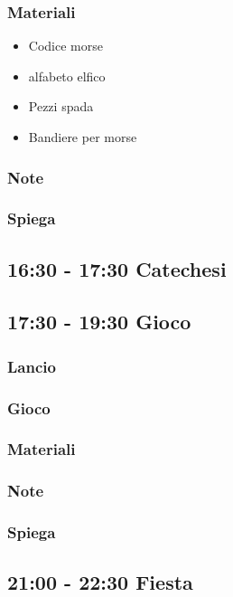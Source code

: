\documentclass[../main.tex]{subfiles}
\begin{document}
        \subsubsection{Materiali}
        \begin{itemize}
            \item Codice morse
            \item alfabeto elfico
            \item Pezzi spada
            \item Bandiere per morse
        \end{itemize}
        \subsubsection{Note}
        \subsubsection{Spiega}       
    \subsection{16:30 - 17:30 Catechesi}   
    \subsection{17:30 - 19:30 Gioco}
        \subsubsection{Lancio}
        \subsubsection{Gioco}
        
        \subsubsection{Materiali}
        \subsubsection{Note}
        \subsubsection{Spiega}    
        
    \subsection{21:00 - 22:30 Fiesta}
\end{document}
